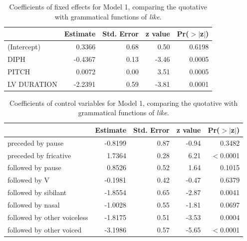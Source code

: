 \begin{table}[ht]
\begin{center}
\begin{tabular}{lrrrr}
  \hline
 & Estimate & Std. Error & z value& Pr($>$$|$z$|$) \\
  \hline  
  
(Intercept)      &  0.3366 &  0.68  & 0.50 & 0.6198 \\
DIPH             &  -0.4367  & 0.13  & -3.46 & 0.0005 \\
PITCH            &  0.0072 &  0.00  &  3.51 & 0.0005 \\
LV DURATION      &  -2.2391 &  0.59  & -3.81 & 0.0001 \\
   \hline
\end{tabular}
\caption{Coefficients of fixed effects for Model 1, comparing the quotative with grammatical functions of \textit{like}.}
\label{qgcoeffProd}
\end{center}
\end{table}


\begin{table}[ht]
\begin{center}
\begin{tabular}{lrrrr}
  \hline
 & Estimate & Std. Error & z value& Pr($>$$|$z$|$) \\
  \hline  
preceded by pause        &  -0.8199  & 0.87 & -0.94 & 0.3482 \\ 
preceded by fricative  		& 1.7364 &  0.28  & 6.21 & $<$0.0001 \\
followed by pause         &  0.8526 &  0.52  & 1.64 & 0.1015 \\
followed by V             &  -0.1981 &  0.42 & -0.47 & 0.6379 \\
followed by sibilant        & -1.8554  & 0.65  & -2.87 & 0.0041 \\
followed by nasal           & -1.0028  & 0.55  & -1.81 & 0.0697 \\
followed by other voiceless  & -1.8175 &  0.51 & -3.53 & 0.0004 \\
followed by other voiced     & -3.1986 &  0.57 & -5.65 & $<$0.0001 \\
   \hline
\end{tabular}
\caption{Coefficients of control variables for Model 1, comparing the quotative with grammatical functions of \textit{like}.}
\label{qgcoeffProd-control}
\end{center}
\end{table}




